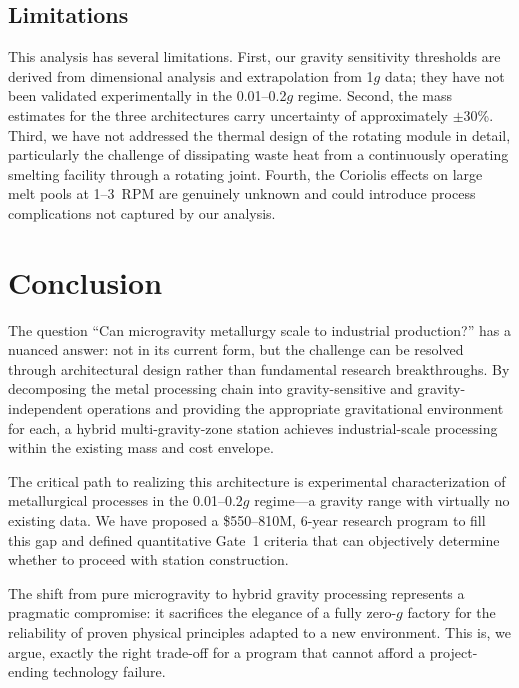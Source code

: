 \documentclass[preprint,12pt]{elsarticle}
\begin{document}
\subsection{Limitations}

This analysis has several limitations. First, our gravity sensitivity thresholds are derived from dimensional analysis and extrapolation from 1$g$ data; they have not been validated experimentally in the 0.01--0.2$g$ regime. Second, the mass estimates for the three architectures carry uncertainty of approximately $\pm$30\%. Third, we have not addressed the thermal design of the rotating module in detail, particularly the challenge of dissipating waste heat from a continuously operating smelting facility through a rotating joint. Fourth, the Coriolis effects on large melt pools at 1--3~RPM are genuinely unknown and could introduce process complications not captured by our analysis.

\section{Conclusion}
\label{sec:conclusion}

The question ``Can microgravity metallurgy scale to industrial production?'' has a nuanced answer: not in its current form, but the challenge can be resolved through architectural design rather than fundamental research breakthroughs. By decomposing the metal processing chain into gravity-sensitive and gravity-independent operations and providing the appropriate gravitational environment for each, a hybrid multi-gravity-zone station achieves industrial-scale processing within the existing mass and cost envelope.

The critical path to realizing this architecture is experimental characterization of metallurgical processes in the 0.01--0.2$g$ regime---a gravity range with virtually no existing data. We have proposed a \$550--810M, 6-year research program to fill this gap and defined quantitative Gate~1 criteria that can objectively determine whether to proceed with station construction.

The shift from pure microgravity to hybrid gravity processing represents a pragmatic compromise: it sacrifices the elegance of a fully zero-$g$ factory for the reliability of proven physical principles adapted to a new environment. This is, we argue, exactly the right trade-off for a program that cannot afford a project-ending technology failure.
\end{document}
